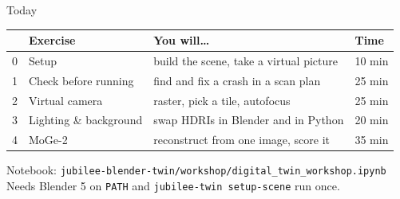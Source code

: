 \documentclass[aspectratio=169,11pt]{beamer}
\begin{document}
\begin{frame}{Today}
\centering
\begin{tabular}{@{}clll@{}}
\toprule
& \textbf{Exercise} & \textbf{You will\dots} & \textbf{Time}\\
\midrule
0 & Setup & build the scene, take a virtual picture & 10 min\\
1 & Check before running & find and fix a crash in a scan plan & 25 min\\
2 & Virtual camera & raster, pick a tile, autofocus & 25 min\\
3 & Lighting \& background & swap HDRIs in Blender and in Python & 20 min\\
4 & MoGe-2 & reconstruct from one image, score it & 35 min\\
\bottomrule
\end{tabular}

\vspace{6mm}
\small Notebook: \texttt{jubilee-blender-twin/workshop/digital\_twin\_workshop.ipynb}\\[1mm]
\footnotesize Needs Blender 5 on \texttt{PATH} and \texttt{jubilee-twin setup-scene} run once.
\end{frame}
\end{document}
